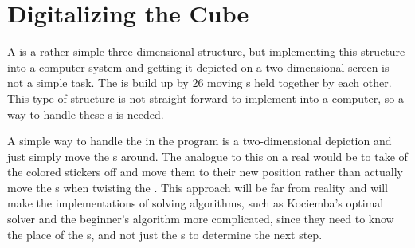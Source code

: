 \chapter{Digitalizing the Cube}
A \rubik{} is a rather simple three-dimensional structure, but implementing this structure into a computer system and getting it depicted on a two-dimensional screen is not a simple task.
The \rubik{} is build up by 26 moving \cpiece{}s held together by each other.  This type of structure is not straight forward to implement into a computer, so a way to handle these \cpiece{}s is needed.

A simple way to handle the \rubik{} in the program is a two-dimensional depiction and  just simply move the \facelet{}s around.
The analogue to this on a real \rubik{} would be to take of the colored stickers off and move them to their new position rather than actually move the \cubie{}s when twisting the \rubik{}.
This approach will be far from reality and will make the implementations of solving algorithms, such as Kociemba's optimal solver and the beginner's algorithm more complicated, since they need to know the place of the \cpiece{}s, and not just the \facelet{}s to determine the next step.


